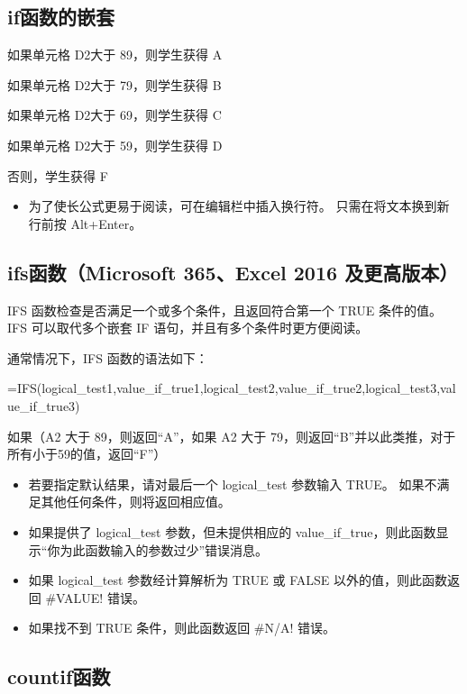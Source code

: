 \subsection{if函数的嵌套}


如果单元格 D2大于 89，则学生获得 A

如果单元格 D2大于 79，则学生获得 B

如果单元格 D2大于 69，则学生获得 C

如果单元格 D2大于 59，则学生获得 D

否则，学生获得 F

\begin{itemize}
    \item 为了使长公式更易于阅读，可在编辑栏中插入换行符。 只需在将文本换到新行前按 Alt+Enter。
\end{itemize}

\subsection{ifs函数（Microsoft 365、Excel 2016 及更高版本）}

IFS 函数检查是否满足一个或多个条件，且返回符合第一个 TRUE 条件的值。 IFS 可以取代多个嵌套 IF 语句，并且有多个条件时更方便阅读。

通常情况下，IFS 函数的语法如下：

=IFS(logical\_test1,value\_if\_true1,logical\_test2,value\_if\_true2,logical\_test3,value\_if\_true3)


如果（A2 大于 89，则返回``A''，如果 A2 大于 79，则返回``B''并以此类推，对于所有小于59的值，返回``F''）

\begin{itemize}
    \item 若要指定默认结果，请对最后一个 logical\_test 参数输入 TRUE。 如果不满足其他任何条件，则将返回相应值。
    \item 如果提供了 logical\_test 参数，但未提供相应的 value\_if\_true，则此函数显示``你为此函数输入的参数过少''错误消息。
    \item 如果 logical\_test 参数经计算解析为 TRUE 或 FALSE 以外的值，则此函数返回 \#VALUE! 错误。
    \item 如果找不到 TRUE 条件，则此函数返回 \#N/A! 错误。
\end{itemize}

\subsection{countif函数}

